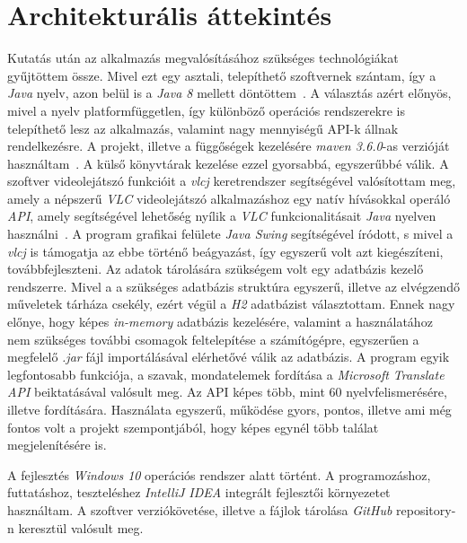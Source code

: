 \section{Architekturális áttekintés}

Kutatás után az alkalmazás megvalósításához szükséges technológiákat gyűjtöttem össze. Mivel ezt egy asztali, telepíthető szoftvernek szántam, így a \textit{Java} nyelv, azon belül is a \textit{Java 8} mellett döntöttem~\cite{JavaApiDoc}.
A választás azért előnyös, mivel a nyelv platformfüggetlen, így különböző operációs rendszerekre is telepíthető lesz az alkalmazás, valamint nagy mennyiségű API-k állnak rendelkezésre. A projekt, illetve a függőségek kezelésére \textit{maven 3.6.0}-as verzióját használtam~\cite{Apache_Maven}.
A külső könyvtárak kezelése ezzel  gyorsabbá, egyszerűbbé válik. A szoftver videolejátszó funkcióit a \textit{vlcj} keretrendszer segítségével valósítottam meg, amely a népszerű \textit{VLC} videolejátszó alkalmazáshoz egy natív hívásokkal operáló \textit{API}, amely segítségével lehetőség nyílik a \textit{VLC} funkcionalitásait \textit{Java} nyelven használni~\cite{Vlcj}.
A program grafikai felülete \textit{Java Swing} segítségével íródott, s mivel a \textit{vlcj} is támogatja az ebbe történő beágyazást, így egyszerű volt azt kiegészíteni, továbbfejleszteni. Az adatok tárolására szükségem volt egy adatbázis kezelő rendszerre. Mivel a a szükséges adatbázis struktúra egyszerű, illetve az elvégzendő műveletek tárháza csekély, ezért végül a \textit{H2} adatbázist választottam. Ennek nagy előnye, hogy képes \textit{in-memory} adatbázis kezelésére, valamint a használatához nem szükséges további csomagok feltelepítése a számítógépre, egyszerűen a megfelelő \textit{.jar} fájl importálásával elérhetővé válik az adatbázis. A program egyik legfontosabb funkciója, a szavak, mondatelemek fordítása a \textit{Microsoft Translate API} beiktatásával valósult meg. Az API képes több, mint 60 nyelvfelismerésére, illetve fordítására. Használata egyszerű, működése gyors, pontos, illetve ami még fontos volt a projekt szempontjából, hogy képes egynél több találat megjelenítésére is.

A fejlesztés \textit{Windows 10} operációs rendszer alatt történt. A programozáshoz, futtatáshoz, teszteléshez \textit{IntelliJ IDEA} integrált fejlesztői környezetet használtam. A szoftver verziókövetése, illetve a fájlok tárolása \textit{GitHub} repository-n keresztül valósult meg.